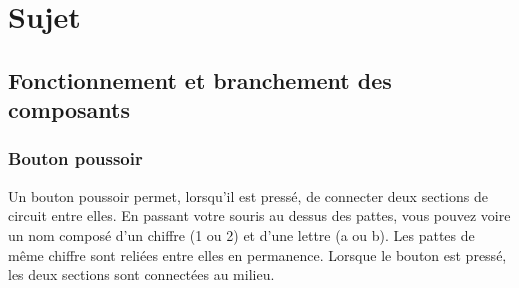 \section{Sujet}

\subsection{Fonctionnement et branchement des composants}

\subsubsection{Bouton poussoir}

Un bouton poussoir permet, lorsqu'il est pressé, de connecter deux sections de circuit entre elles.
En passant votre souris au dessus des pattes, vous pouvez voire un nom composé d'un chiffre (1 ou 2) et d'une lettre (a ou b).
Les pattes de même chiffre sont reliées entre elles en permanence.
Lorsque le bouton est pressé, les deux sections sont connectées au milieu.